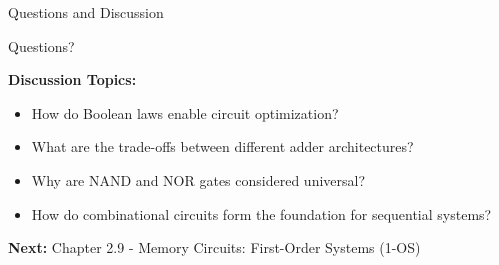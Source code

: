 \begin{frame}{Questions and Discussion}
\begin{center}
\Large
Questions?

\vspace{1cm}

\normalsize
\textbf{Discussion Topics:}
\begin{itemize}
\item How do Boolean laws enable circuit optimization?
\item What are the trade-offs between different adder architectures?
\item Why are NAND and NOR gates considered universal?
\item How do combinational circuits form the foundation for sequential systems?
\end{itemize}

\vspace{0.5cm}
\textbf{Next:} Chapter 2.9 - Memory Circuits: First-Order Systems (1-OS)
\end{center}
\end{frame}


